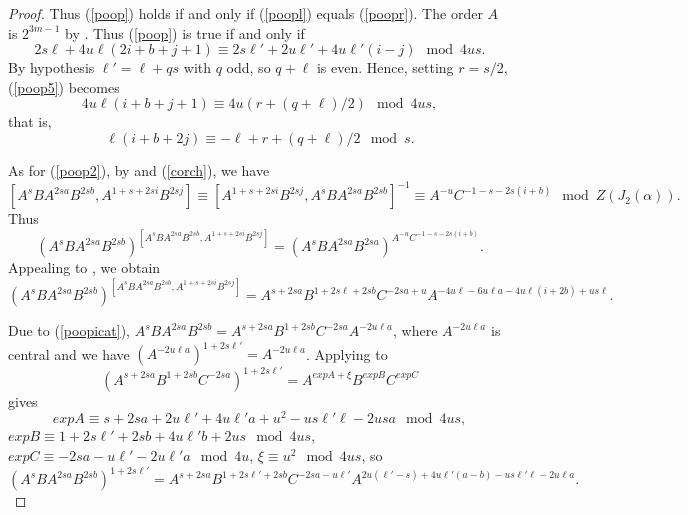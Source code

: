 \documentclass{amsart}
\theoremstyle{definition}
\theoremstyle{remark}
\begin{document}
\begin{proof}
	Thus (\ref{poop}) holds if and only if (\ref{poopl}) equals (\ref{poopr}). The order $A$ is $2^{3m-1}$ by \cite[Theorem 7.2]{MS}.
	Thus (\ref{poop}) is true if and only if
		\begin{equation}
    \label{poop5}
		2s\ell+4u\ell(2i+b+j+1)\equiv 2s\ell'+2u\ell'+4u\ell'(i-j)\mod 4us.
		\end{equation}
		By  hypothesis $\ell'=\ell+q s$ with $q$ odd, so $q+\ell$ is even. Hence, setting $r=s/2$, (\ref{poop5}) becomes
		$$
		4u\ell(i+b+j+1)\equiv 4u(r+(q+\ell)/2) \mod 4us,
		$$
		that is,
		\begin{equation}
    \label{poop6}
\ell(i+b+2j)\equiv -\ell+ r+(q+\ell)/2\mod s.
\end{equation}

		As for (\ref{poop2}), by \cite[Theorem 3.1 and Corollary 3.3]{MS3} and (\ref{corch}), we have
		$$
		[A^s BA^{2sa}B^{2sb},A^{1+s+2si}B^{2sj}]\equiv [A^{1+s+2si}B^{2sj},A^s BA^{2sa}B^{2sb}]^{-1}\equiv
		A^{-u} C^{-1 -s - 2s(i+b)}\mod Z(J_2(\alpha)).
		$$
Thus
$$
(A^s BA^{2sa}B^{2sb})^{[A^s BA^{2sa}B^{2sb},A^{1+s+2si}B^{2sj}]}=(A^s BA^{2sa}B^{2sa})^{A^{-u} C^{-1 -s - 2s(i+b)}}.
$$
Appealing to \cite[Theorem 3.1]{MS3}, we obtain
\begin{equation}
    \label{poop2l}
(A^s BA^{2sa}B^{2sb})^{[A^s BA^{2sa}B^{2sb},A^{1+s+2si}B^{2sj}]}=A^{s+2sa} B^{1+2s\ell+2sb}C^{-2sa+u}
A^{-4u\ell-6u\ell a-4u\ell(i+2b)+us\ell}.
\end{equation}

Due to (\ref{poopicat}), $A^s B A^{2sa}B^{2sb}=A^{s+2sa}B^{1+2sb} C^{-2sa}A^{-2u\ell a}$, where $A^{-2u\ell a}$ is central and we have
$(A^{-2u\ell a})^{1+2s\ell'}=A^{-2u\ell a}$. Applying \cite[Theorem 3.5]{MS3} to
$$(A^{s+2sa}B^{1+2sb} C^{-2sa})^{1+2s\ell'}= A^{expA + \xi} B^{expB} C^{expC}$$
gives
$$expA\equiv s + 2sa+2u\ell'+4u\ell' a+u^2-us\ell'\ell-2usa\mod 4us,$$
 $expB\equiv 1+2s\ell'+2sb+4u\ell'b+2us\mod 4us$,
    $expC\equiv -2sa-u\ell'-2u\ell' a\mod 4u$,
    $\xi\equiv u^2\mod 4us$, so
	\begin{equation}
    \label{poop2r}
(A^s B A^{2sa}B^{2sb})^{1+2s\ell'}=
A^{s + 2sa}	B^{1+2s\ell'+2sb}C^{-2sa-u\ell'}A^{2u(\ell'-s)+4u\ell'(a-b)-us\ell'\ell-2u\ell a}.
\end{equation}


\end{proof}
\end{document}
